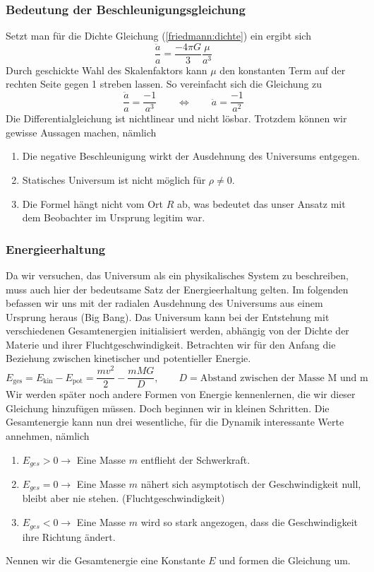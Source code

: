 \begin{refsection}
\subsubsection{Bedeutung der Beschleunigungsgleichung}
Setzt man für die Dichte Gleichung (\ref{friedmann:dichte}) ein ergibt sich
\[\frac{\ddot{a}}{a} = \frac{- 4 \pi G}{3} \frac{\mu}{a^3} \]
Durch geschickte Wahl des Skalenfaktors kann $\mu$ den konstanten Term auf der rechten Seite gegen 1 streben lassen. So vereinfacht sich die Gleichung zu
\[\frac{\ddot{a}}{a} = \frac{-1}{a^3} \qquad\Leftrightarrow\qquad \ddot{a} = \frac{-1}{a^2}\]
Die Differentialgleichung ist nichtlinear  und nicht lösbar. Trotzdem können wir gewisse Aussagen machen, nämlich
\begin{enumerate}
	\item Die negative Beschleunigung wirkt der Ausdehnung des Universums entgegen. 
	\item Statisches Universum ist nicht möglich für $\rho \neq 0$.
	\item Die Formel hängt nicht vom Ort $R$ ab, was bedeutet das unser Ansatz mit dem Beobachter im Ursprung legitim war.
\end{enumerate}

\subsubsection{Energieerhaltung}
Da wir versuchen, das Universum als ein physikalisches System zu beschreiben, muss auch hier der bedeutsame Satz der Energieerhaltung gelten. Im folgenden befassen wir uns mit der radialen Ausdehnung des Universums aus einem Ursprung heraus (Big Bang). Das Universum kann bei der Entstehung mit verschiedenen Gesamtenergien initialisiert werden, abhängig von der Dichte der Materie und ihrer Fluchtgeschwindigkeit. Betrachten wir für den Anfang die Beziehung zwischen kinetischer und potentieller Energie.
\begin{equation}
E_{\text{ges}} = E_{\text{kin}} - E_{\text{pot}} =  \frac{m v^2}{2} - \frac{m M G }{D}, \qquad D = \text{Abstand zwischen der Masse M und m}
\end{equation}
Wir werden später noch andere Formen von Energie kennenlernen, die wir dieser Gleichung hinzufügen müssen. Doch beginnen wir in kleinen Schritten. Die Gesamtenergie kann nun drei wesentliche, für die Dynamik interessante Werte annehmen, nämlich
\begin{enumerate}
	\item $E_{ges} > 0 \rightarrow$ Eine Masse $m$ entflieht der Schwerkraft.
	\item $E_{ges} = 0 \rightarrow$ Eine Masse $m$ nähert sich asymptotisch  der Geschwindigkeit null, bleibt aber nie stehen. (Fluchtgeschwindigkeit)
	\item $E_{ges} < 0 \rightarrow$ Eine Masse $m$ wird so stark angezogen, dass die Geschwindigkeit ihre Richtung ändert.
\end{enumerate}
Nennen wir die Gesamtenergie eine Konstante $E$ und formen die Gleichung um.


\end{refsection}
